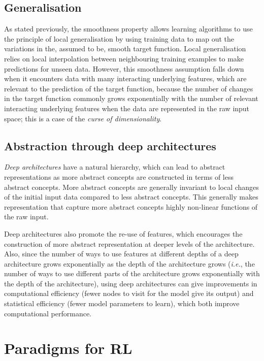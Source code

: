 \subsection{Generalisation}

As stated previously, the smoothness property allows learning algorithms to use the principle of local generalisation by using training data to map out the variations in the, assumed to be, smooth target function.
Local generalisation relies on local interpolation between neighbouring training examples to make predictions for unseen data.
However, this smoothness assumption falls down when it encounters data with many interacting underlying features, which are relevant to the prediction of the target function, because the number of changes in the target function commonly grows exponentially with the number of relevant interacting underlying features when the data are represented in the raw input space; this is a case of the \textit{curse of dimensionality}.

\subsection{Abstraction through deep architectures}

\textit{Deep architectures} have a natural hierarchy, which can lead to abstract representations as more abstract concepts are constructed in terms of less abstract concepts.
More abstract concepts are generally invariant to local changes of the initial input data compared to less abstract concepts.
This generally makes representation that capture more abstract concepts highly non-linear functions of the raw input.

Deep architectures also promote the re-use of features, which encourages the construction of more abstract representation at deeper levels of the architecture.
Also, since the number of ways to use features at different depths of a deep architecture grows exponentially as the depth of the architecture grows (\textit{i.e.}, the number of ways to use different parts of the architecture grows exponentially with the depth of the architecture), using deep architectures can give improvements in computational efficiency (fewer nodes to visit for the model give its output) and statistical efficiency (fewer model parameters to learn), which both improve computational performance.

\section{Paradigms for RL}\label{sec:Paradigms for RL}

